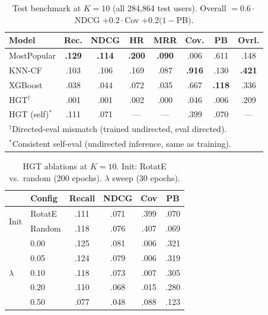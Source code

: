 \documentclass[10pt,twocolumn,letterpaper]{article}
\begin{document}
\begin{table}[h]
\centering\footnotesize
\caption{Test benchmark at $K{=}10$ (all 284,864 test users). Overall $= 0.6\cdot$NDCG $+ 0.2\cdot$Cov $+ 0.2(1-$PB$)$.}
\label{tab:bench}
\setlength{\tabcolsep}{3.5pt}
\renewcommand{\arraystretch}{1.1}
\begin{tabular}{lccccccc}
\toprule
\textbf{Model} & \textbf{Rec.} & \textbf{NDCG} & \textbf{HR} & \textbf{MRR} & \textbf{Cov.} & \textbf{PB} & \textbf{Ovrl.}\\
\midrule
MostPopular   & \textbf{.129} & \textbf{.114} & \textbf{.200} & \textbf{.090} & .006 & .611 & .148\\
KNN-CF        & .103 & .106 & .169 & .087 & \textbf{.916} & .130 & \textbf{.421}\\
XGBoost       & .038 & .044 & .072 & .035 & .667 & \textbf{.118} & .336\\
HGT$^\dagger$ & .001 & .001 & .002 & .000 & .046 & .006 & .209\\
\midrule
HGT (self)$^*$& .111 & .071 & --- & --- & .399 & .070 & ---\\
\bottomrule
\multicolumn{8}{l}{\tiny $^\dagger$Directed-eval mismatch (trained undirected, eval directed).}\\
\multicolumn{8}{l}{\tiny $^*$Consistent self-eval (undirected inference, same as training).}
\end{tabular}
\end{table}

\begin{table}[h]
\centering\footnotesize
\caption{HGT ablations at $K{=}10$. Init: RotatE vs.\ random (200 epochs). $\lambda$ sweep (30 epochs).}
\label{tab:abl}
\setlength{\tabcolsep}{3pt}
\renewcommand{\arraystretch}{1.1}
\begin{tabular}{llcccc}
\toprule
& \textbf{Config} & \textbf{Recall} & \textbf{NDCG} & \textbf{Cov} & \textbf{PB}\\
\midrule
\multirow{2}{*}{Init}
  & RotatE & .111 & .071 & .399 & .070\\
  & Random & .118 & .076 & .407 & .069\\
\midrule
\multirow{5}{*}{$\lambda$}
  & 0.00 & .125 & .081 & .006 & .321\\
  & 0.05 & .124 & .079 & .006 & .319\\
  & 0.10 & .118 & .073 & .007 & .305\\
  & 0.20 & .110 & .068 & .015 & .280\\
  & 0.50 & .077 & .048 & .088 & .123\\
\bottomrule
\end{tabular}
\end{table}
\end{document}
